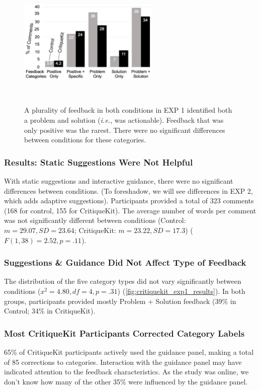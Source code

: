 \begin{figure}[b!]
\centering
  \includegraphics[width=0.6\textwidth]{critiquekit/figures/exp1_feedbacktypes.png}
  \caption{A plurality of feedback in both conditions in EXP 1 identified both a problem and solution (\textit{i.e.}, was actionable). Feedback that was only positive was the rarest. There were no significant differences between conditions for these categories.}~\label{fig:critiquekit_exp1_results}
\end{figure}

\subsubsection{Results: Static Suggestions Were Not Helpful}
With static suggestions and interactive guidance, there were no significant differences between conditions. (To foreshadow, we will see differences in EXP 2, which adds adaptive suggestions). Participants provided a total of 323 comments (168 for control, 155 for CritiqueKit). The average number of words per comment was not significantly different between conditions (Control: $m = 29.07, SD = 23.64$; CritiqueKit: $m = 23.22, SD = 17.3$) ($F(1,38) = 2.52, p = .11$).

\subsubsection{Suggestions \& Guidance Did Not Affect Type of Feedback}
The distribution of the five category types did not vary significantly between conditions ($x^2 = 4.80, df = 4, p = .31$) (\autoref{fig:critiquekit_exp1_results}). In both groups, participants provided mostly Problem + Solution feedback (39\% in Control; 34\% in CritiqueKit). 

\subsubsection{Most CritiqueKit Participants Corrected Category Labels}
65\% of CritiqueKit participants actively used the guidance panel, making a total of 85 corrections to categories. Interaction with the guidance panel may have indicated attention to the feedback characteristics. As the study was online, we don't know how many of the other 35\% were influenced by the guidance panel. 

